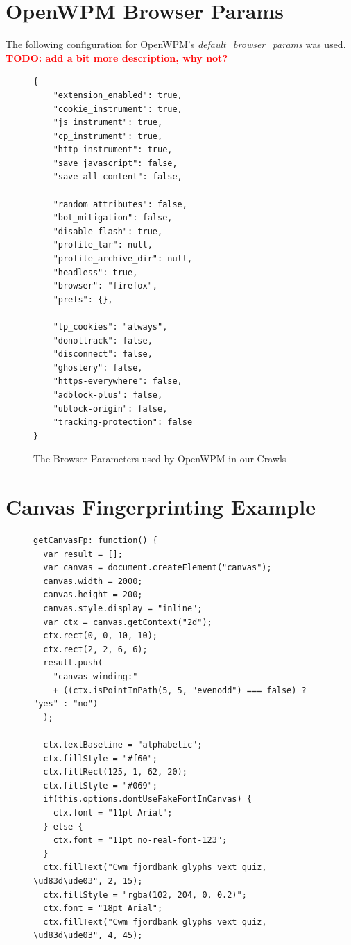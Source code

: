 \documentclass[
    fontsize=12pt,
    headings=small,
    parskip=half,
    bibliography=totoc,
    numbers=noenddot,
    open=any
    ]{scrreprt}
\newcommand{\todo}[1]{\textcolor{red}{\textbf{TODO: #1}}}
\begin{document}
\begin{appendices}

\chapter{OpenWPM Browser Params}
The following configuration for OpenWPM's \textit{default\_browser\_params} was used.
\todo{add a bit more description, why not?}


\begin{figure}
\label{app:params}
\begin{verbatim}
{
    "extension_enabled": true,
    "cookie_instrument": true,
    "js_instrument": true,
    "cp_instrument": true,
    "http_instrument": true,
    "save_javascript": false,
    "save_all_content": false,

    "random_attributes": false,
    "bot_mitigation": false,
    "disable_flash": true,
    "profile_tar": null,
    "profile_archive_dir": null,
    "headless": true,
    "browser": "firefox",
    "prefs": {},

    "tp_cookies": "always",
    "donottrack": false,
    "disconnect": false,
    "ghostery": false,
    "https-everywhere": false,
    "adblock-plus": false,
    "ublock-origin": false,
    "tracking-protection": false
}
\end{verbatim}
\caption{The Browser Parameters used by OpenWPM in our Crawls}
\end{figure}


\chapter{Canvas Fingerprinting Example}
\begin{figure}
\begin{verbatim}
getCanvasFp: function() {
  var result = [];
  var canvas = document.createElement("canvas");
  canvas.width = 2000;
  canvas.height = 200;
  canvas.style.display = "inline";
  var ctx = canvas.getContext("2d");
  ctx.rect(0, 0, 10, 10);
  ctx.rect(2, 2, 6, 6);
  result.push(
    "canvas winding:"
    + ((ctx.isPointInPath(5, 5, "evenodd") === false) ? "yes" : "no")
  );

  ctx.textBaseline = "alphabetic";
  ctx.fillStyle = "#f60";
  ctx.fillRect(125, 1, 62, 20);
  ctx.fillStyle = "#069";
  if(this.options.dontUseFakeFontInCanvas) {
    ctx.font = "11pt Arial";
  } else {
    ctx.font = "11pt no-real-font-123";
  }
  ctx.fillText("Cwm fjordbank glyphs vext quiz, \ud83d\ude03", 2, 15);
  ctx.fillStyle = "rgba(102, 204, 0, 0.2)";
  ctx.font = "18pt Arial";
  ctx.fillText("Cwm fjordbank glyphs vext quiz, \ud83d\ude03", 4, 45);


\end{verbatim}
\end{figure}
\end{appendices}
\end{document}
